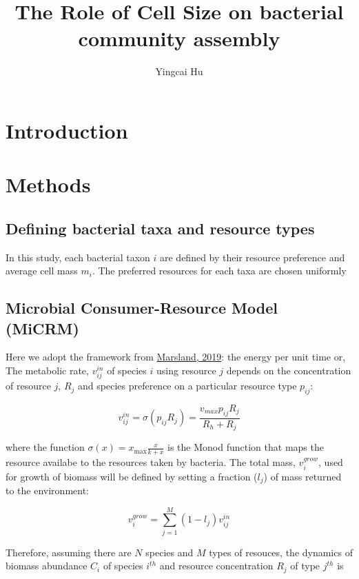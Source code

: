 \documentclass[12pt]{article}
\title{The Role of Cell Size on bacterial community assembly}
\author{Yingcai Hu}
\begin{document}
\maketitle

\section{Introduction}

\section{Methods}

\subsection{Defining bacterial taxa and resource types}

In this study, each bacterial taxon $i$ are defined by their resource preference and average cell mass $m_i$. The preferred resources for each taxa are chosen uniformly 

\subsection{Microbial Consumer-Resource Model (MiCRM)}

Here we adopt the framework from \href{https://journals.plos.org/ploscompbiol/articleid=10.1371/journal.pcbi.1006793}{Marsland, 2019}: the energy per unit time or, The metabolic rate, $v^{in}_{ij}$ of species $i$ using resource $j$ depends on the concentration of resource $j$, $R_j$ and species preference on a particular resource type $p_{ij}$:

\begin{equation}
    v^{in}_{ij} =  \sigma(p_{ij} R_j) = \frac{v_{max}p_{ij}R_{ j}}{R_h + R_{j}}
\end{equation}


where the function $\sigma(x) = x_{\max} \frac{x}{k + x}$ is the Monod function that maps the resource availabe to the resources taken by bacteria. The total mass, $ v^{grow}_i $, used for growth of biomass will be defined by setting a fraction ($l_{j}$) of mass returned to the environment:

\begin{equation}
    v^{grow}_{i} = \sum^M_{j=1} (1-l_{j}) v^{in}_{ij}
\end{equation}

Therefore, assuming there are $N$ species and $M$ types of resouces,
the dynamics of biomass abundance $C_i$ of species $i^{th}$ and resource concentration $R_j$ of type $j^{th}$  is
\end{document}
